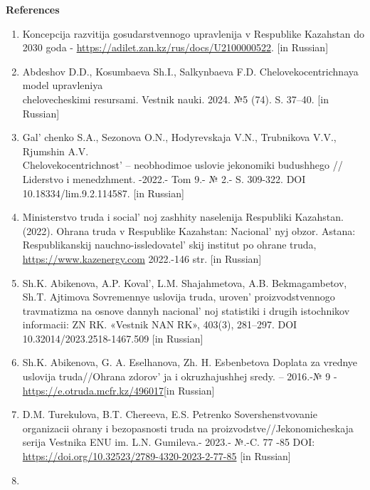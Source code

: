 \begin{center}

{\bfseries References}

\end{center}
\begin{references}
\begin{enumerate}
\def\labelenumi{\arabic{enumi}.}
\item
  Koncepcija razvitija gosudarstvennogo upravlenija v Respublike
  Kazahstan do 2030 goda -
  \url{https://adilet.zan.kz/rus/docs/U2100000522}. {[}in Russian{]}
\item
  Abdeshov D.D., Kosumbaeva Sh.I., Salkynbaeva F.D.
  Chelovekocentrichnaya model upravleniya \\chelovecheskimi resursami.
  Vestnik nauki. 2024. №5 (74). S. 37--40. {[}in Russian{]}
\item
  Gal' chenko S.A., Sezonova O.N., Hodyrevskaja V.N.,
  Trubnikova V.V., Rjumshin A.V. \\Chelovekocentrichnost'{}
  -- neobhodimoe uslovie jekonomiki budushhego // Liderstvo i
  menedzhment. -2022.- Tom 9.- № 2.- S. 309-322. DOI
  10.18334/lim.9.2.114587. {[}in Russian{]}
\item
  Ministerstvo truda i social' noj zashhity naselenija
  Respubliki Kazahstan. (2022). Ohrana truda v Respublike Kazahstan:
  Nacional' nyj obzor. Astana: Respublikanskij
  nauchno-issledovatel' skij institut po ohrane truda,
  \href{https://www.kazenergy.com/upload/document/development/ohrana_2023.pdf}{https://www.kazenergy.com}
  2022.-146 str.  {[}in Russian{]}
\item
  Sh.K. Abikenova, A.P. Koval', L.M. Shajahmetova, A.B.
  Bekmagambetov, Sh.T. Ajtimova Sovremennye uslovija truda,
  uroven'{} proizvodstvennogo travmatizma na osnove
  dannyh nacional' noj statistiki i drugih istochnikov
  informacii: ZN RK. «Vestnik NAN RK», 403(3), 281--297. DOI
  10.32014/2023.2518-1467.509 {[}in Russian{]}
\item
  Sh.K. Abikenova, G. A. Eselhanova, Zh. H. Esbenbetova Doplata za
  vrednye uslovija truda//Ohrana zdorov' ja i
  okruzhajushhej sredy. -- 2016.-№ 9 -
  \url{https://e.otruda.mcfr.kz/496017}{[}in Russian{]}
\item
  D.M. Turekulova, B.T. Chereeva, E.S. Petrenko Sovershenstvovanie
  organizacii ohrany i bezopasnosti truda na
  proizvodstve//Jekonomicheskaja serija Vestnika ENU im. L.N. Gumileva.-
  2023.- №.-C. 77 -85 DOI:
  \url{https://doi.org/10.32523/2789-4320-2023-2-77-85} {[}in Russian{]}
\item

\end{enumerate}
\end{references}
